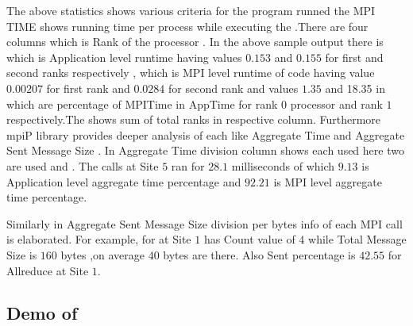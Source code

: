 The above statistics shows various criteria for the program runned the MPI TIME
shows running time per process while executing the .There are four
columns  which is Rank of the processor . In the above sample output there is which
is Application level runtime having values $0.153$ and $0.155$ for first and second ranks respectively
, which is MPI level runtime of code having value $0.00207$ for first rank
and $0.0284$ for second rank and values $1.35$ and 18.35 in  which are percentage of MPITime 
in AppTime for rank $0$ processor and rank $1$ respectively.The \code{*} shows sum of total ranks in respective column.
Furthermore mpiP library provides deeper analysis of each  like Aggregate Time and 
Aggregate Sent Message Size . In Aggregate Time division  column shows each  used
here two are used  and . The  calls at Site $5$ ran for $28.1$ milliseconds 
of which $9.13$ is Application level aggregate time percentage and $92.21$ is MPI level aggregate time percentage.

Similarly in Aggregate Sent Message Size division per bytes info of each MPI call is elaborated.
For example, for  at Site $1$ has Count value of $4$ while Total Message Size is $160$ bytes ,on average $40$ bytes are there.
Also Sent percentage is $42.55$ for Allreduce at Site $1$.




\subsection{Demo of }

